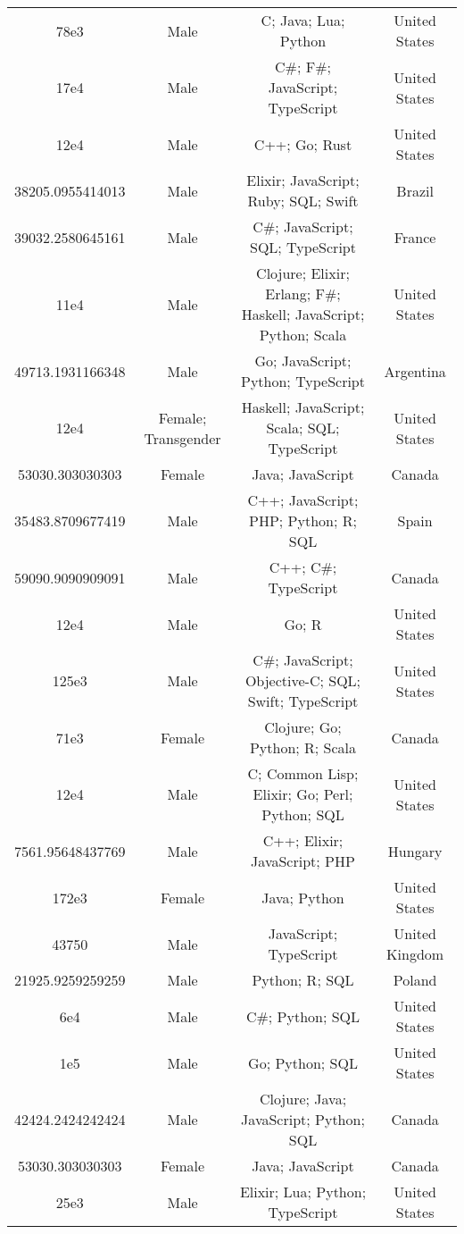 \begin{center}
\begin{tabular}{ |c|c|c|c| }
78e3  &  Male  &  C; Java; Lua; Python  &  United States  \\ 
17e4  &  Male  &  C\#; F\#; JavaScript; TypeScript  &  United States  \\ 
12e4  &  Male  &  C++; Go; Rust  &  United States  \\ 
38205.0955414013  &  Male  &  Elixir; JavaScript; Ruby; SQL; Swift  &  Brazil  \\ 
39032.2580645161  &  Male  &  C\#; JavaScript; SQL; TypeScript  &  France  \\ 
11e4  &  Male  &  Clojure; Elixir; Erlang; F\#; Haskell; JavaScript; Python; Scala  &  United States  \\ 
49713.1931166348  &  Male  &  Go; JavaScript; Python; TypeScript  &  Argentina  \\ 
12e4  &  Female; Transgender  &  Haskell; JavaScript; Scala; SQL; TypeScript  &  United States  \\ 
53030.303030303  &  Female  &  Java; JavaScript  &  Canada  \\ 
35483.8709677419  &  Male  &  C++; JavaScript; PHP; Python; R; SQL  &  Spain  \\ 
59090.9090909091  &  Male  &  C++; C\#; TypeScript  &  Canada  \\ 
12e4  &  Male  &  Go; R  &  United States  \\ 
125e3  &  Male  &  C\#; JavaScript; Objective-C; SQL; Swift; TypeScript  &  United States  \\ 
71e3  &  Female  &  Clojure; Go; Python; R; Scala  &  Canada  \\ 
12e4  &  Male  &  C; Common Lisp; Elixir; Go; Perl; Python; SQL  &  United States  \\ 
7561.95648437769  &  Male  &  C++; Elixir; JavaScript; PHP  &  Hungary  \\ 
172e3  &  Female  &  Java; Python  &  United States  \\ 
43750  &  Male  &  JavaScript; TypeScript  &  United Kingdom  \\ 
21925.9259259259  &  Male  &  Python; R; SQL  &  Poland  \\ 
6e4  &  Male  &  C\#; Python; SQL  &  United States  \\ 
1e5  &  Male  &  Go; Python; SQL  &  United States  \\ 
42424.2424242424  &  Male  &  Clojure; Java; JavaScript; Python; SQL  &  Canada  \\ 
53030.303030303  &  Female  &  Java; JavaScript  &  Canada  \\ 
25e3  &  Male  &  Elixir; Lua; Python; TypeScript  &  United States  \\ 

\end{tabular}
\end{center}
